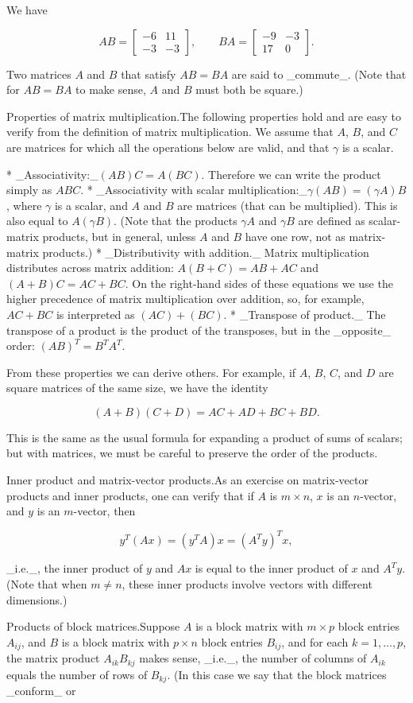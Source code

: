 We have

\[AB=\left[\begin{array}{cc}-6&11\\ -3&-3\end{array}\right],\qquad BA=\left[\begin{array}{cc}-9&-3\\ 17&0\end{array}\right].\]

Two matrices \(A\) and \(B\) that satisfy \(AB=BA\) are said to _commute_. (Note that for \(AB=BA\) to make sense, \(A\) and \(B\) must both be square.)

Properties of matrix multiplication.The following properties hold and are easy to verify from the definition of matrix multiplication. We assume that \(A\), \(B\), and \(C\) are matrices for which all the operations below are valid, and that \(\gamma\) is a scalar.

* _Associativity:_\((AB)C=A(BC)\). Therefore we can write the product simply as \(ABC\).
* _Associativity with scalar multiplication:_\(\gamma(AB)=(\gamma A)B\), where \(\gamma\) is a scalar, and \(A\) and \(B\) are matrices (that can be multiplied). This is also equal to \(A(\gamma B)\). (Note that the products \(\gamma A\) and \(\gamma B\) are defined as scalar-matrix products, but in general, unless \(A\) and \(B\) have one row, not as matrix-matrix products.)
* _Distributivity with addition._ Matrix multiplication distributes across matrix addition: \(A(B+C)=AB+AC\) and \((A+B)C=AC+BC\). On the right-hand sides of these equations we use the higher precedence of matrix multiplication over addition, so, for example, \(AC+BC\) is interpreted as \((AC)+(BC)\).
* _Transpose of product._ The transpose of a product is the product of the transposes, but in the _opposite_ order: \((AB)^{T}=B^{T}A^{T}\).

From these properties we can derive others. For example, if \(A\), \(B\), \(C\), and \(D\) are square matrices of the same size, we have the identity

\[(A+B)(C+D)=AC+AD+BC+BD.\]

This is the same as the usual formula for expanding a product of sums of scalars; but with matrices, we must be careful to preserve the order of the products.

Inner product and matrix-vector products.As an exercise on matrix-vector products and inner products, one can verify that if \(A\) is \(m\times n\), \(x\) is an \(n\)-vector, and \(y\) is an \(m\)-vector, then

\[y^{T}(Ax)=(y^{T}A)x=(A^{T}y)^{T}x,\]

_i.e._, the inner product of \(y\) and \(Ax\) is equal to the inner product of \(x\) and \(A^{T}y\). (Note that when \(m\neq n\), these inner products involve vectors with different dimensions.)

Products of block matrices.Suppose \(A\) is a block matrix with \(m\times p\) block entries \(A_{ij}\), and \(B\) is a block matrix with \(p\times n\) block entries \(B_{ij}\), and for each \(k=1,\ldots,p\), the matrix product \(A_{ik}B_{kj}\) makes sense, _i.e._, the number of columns of \(A_{ik}\) equals the number of rows of \(B_{kj}\). (In this case we say that the block matrices _conform_ or 